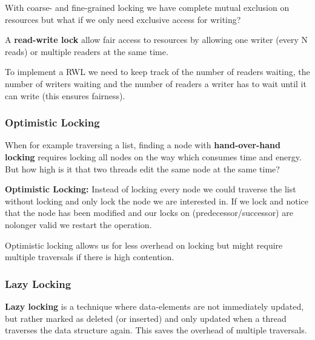 \begin{remark}
    With coarse- and fine-grained locking we have complete mutual exclusion on resources but what if we only need exclusive access for writing?
\end{remark}

\begin{definition}
    A \textbf{read-write lock} allow fair access to resources by allowing one writer (every N reads) or multiple readers at the same time.
\end{definition}

\begin{remark}
    To implement a RWL we need to keep track of the number of readers waiting, the number of writers waiting and the number of readers a writer has to wait until it can write (this ensures fairness).
\end{remark}

\subsubsection{Optimistic Locking}

\begin{remark}
    When for example traversing a list, finding a node with \textbf{hand-over-hand locking} requires locking all nodes on the way which consumes time and energy. But how high is it that two threads edit the same node at the same time? 
\end{remark}

\begin{definition}
    \textbf{Optimistic Locking: } Instead of locking every node we could traverse the list without locking and only lock the node we are interested in. If we lock and notice that the node has been modified and our locks on (predecessor/successor) are nolonger valid we restart the operation.
\end{definition}

\begin{remark}
    Optimistic locking allows us for less overhead on locking but might require multiple traversals if there is high contention.
\end{remark}

\subsubsection{Lazy Locking}

\begin{definition}
    \textbf{Lazy locking} is a technique where data-elements are not immediately updated, but rather marked as deleted (or inserted) and only updated when a thread traverses the data structure again. This saves the overhead of multiple traversals.
\end{definition}

